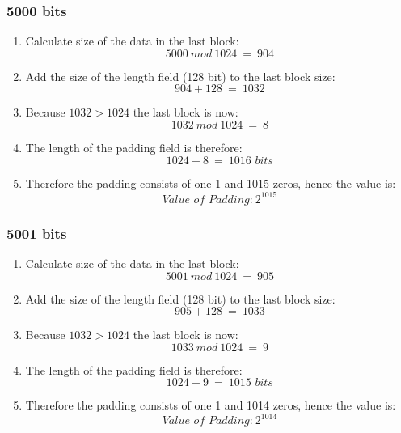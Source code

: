 \documentclass{report}
\begin{document}
			\subsubsection{5000 bits}
			\startsubsection
				\begin{enumerate}
					\item Calculate size of the data in the last block:
					\[
						5000 \ mod \ 1024 \ = \ 904
					\]
					\item Add the size of the length field (128 bit) to the last block size:
					\[
						904 + 128 \ = \ 1032
					\]
					\item Because $1032 > 1024$ the last block is now:
					\[
						1032 \ mod \ 1024 \ = \ 8
					\]
					\item The length of the padding field is therefore:
					\[
						1024 - 8 \ = \ 1016 \textit{ bits}
					\]
					\item Therefore the padding consists of one 1 and 1015 zeros, hence the value is:
					\[
						\textit{Value of Padding:} \ 2^{1015}
					\]
				\end{enumerate}
			\closesection
			\subsubsection{5001 bits}
			\startsubsection
				\begin{enumerate}
					\item Calculate size of the data in the last block:
					\[
						5001 \ mod \ 1024 \ = \ 905
					\]
					\item Add the size of the length field (128 bit) to the last block size:
					\[
						905 + 128 \ = \ 1033
					\]
					\item Because $1032 > 1024$ the last block is now:
					\[
						1033 \ mod \ 1024 \ = \ 9
					\]
					\item The length of the padding field is therefore:
					\[
						1024 - 9 \ = \ 1015 \textit{ bits}
					\]
					\item Therefore the padding consists of one 1 and 1014 zeros, hence the value is:
					\[
						\textit{Value of Padding:} \ 2^{1014}
					\]
				\end{enumerate}
			\closesection
\end{document}
